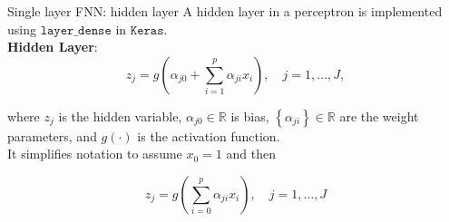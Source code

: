 \documentclass{beamer}
\begin{document}
\begin{frame}{Single layer FNN: hidden layer}
A hidden layer in a perceptron is implemented using  $\texttt{layer\_dense}$ in $\texttt{Keras}$.\\
\textbf{Hidden Layer}:
$$
z_{j}=g\left(\alpha_{j 0}+\sum_{i=1}^{p} \alpha_{j i} x_{i}\right), \quad j=1, \ldots, J,
$$

where $z_{j}$ is the hidden variable, $\alpha_{j 0}\in\mathbb{R}$ is bias, $\left\{\alpha_{j i}\right\}\in\mathbb{R}$ are the weight parameters, and $g(\cdot)$ is the activation function.\\
It simplifies notation to assume $x_{0}=1$ and then

$$
z_{j}=g\left(\sum_{i=0}^{p} \alpha_{j i} x_{i}\right), \quad j=1, \ldots, J
$$
\end{frame}
\end{document}
